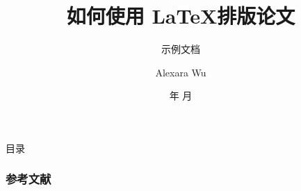 \documentclass[xcolor=table,dvipsnames,svgnames,aspectratio=169]{ctexbeamer}
\author{Alexara Wu}
\institute[SJTUG]{上海交通大学 Linux 用户组}
\date{\the\year 年 \the\month 月}
\title[\SJTUBeamer 示例文档] %
{\textbf{如何使用 \LaTeX 排版论文}} %
\subtitle{\SJTUBeamer 示例文档}
\begin{document}
\AtBeginSection[]{
  \begin{frame}
    \sectionpage                   %
  \end{frame}
}

\AtBeginSubsection[]{                  %
  \begin{frame}
    \subsectionpage                %
  \end{frame}
}

\maketitle

\begin{frame}{目录}
  \tableofcontents
\end{frame}






\appendix

\begin{frame}
  \frametitle{参考文献}
  \printbibliography
\end{frame}

\makebottom
\end{document}
